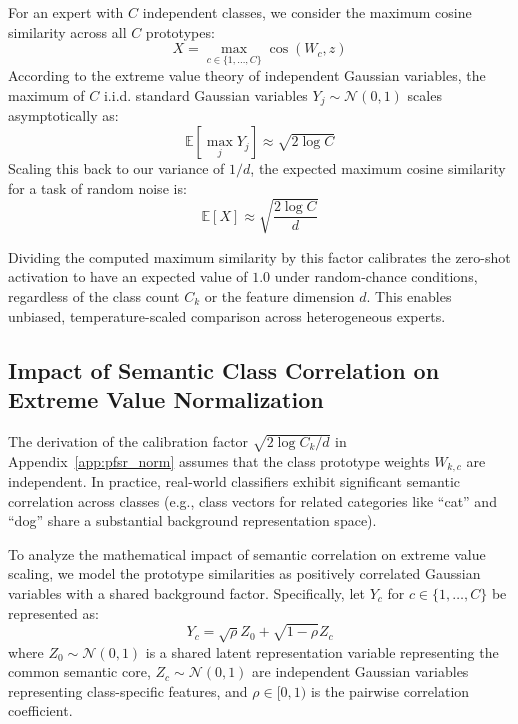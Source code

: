 \documentclass{article}
\theoremstyle{plain}
\theoremstyle{definition}
\theoremstyle{remark}
\begin{document}
For an expert with $C$ independent classes, we consider the maximum cosine similarity across all $C$ prototypes:
\begin{equation}
X = \max_{c \in \{1, \dots, C\}} \cos(W_c, z)
\end{equation}
According to the extreme value theory of independent Gaussian variables, the maximum of $C$ i.i.d. standard Gaussian variables $Y_j \sim \mathcal{N}(0, 1)$ scales asymptotically as:
\begin{equation}
\mathbb{E}[\max_{j} Y_j] \approx \sqrt{2 \log C}
\end{equation}
Scaling this back to our variance of $1/d$, the expected maximum cosine similarity for a task of random noise is:
\begin{equation}
\mathbb{E}[X] \approx \sqrt{\frac{2 \log C}{d}}
\end{equation}

Dividing the computed maximum similarity by this factor calibrates the zero-shot activation to have an expected value of $1.0$ under random-chance conditions, regardless of the class count $C_k$ or the feature dimension $d$. This enables unbiased, temperature-scaled comparison across heterogeneous experts.

\subsection{Impact of Semantic Class Correlation on Extreme Value Normalization}
\label{app:class_correlation}

The derivation of the calibration factor $\sqrt{2\log C_k / d}$ in Appendix~\ref{app:pfsr_norm} assumes that the class prototype weights $W_{k, c}$ are independent. In practice, real-world classifiers exhibit significant semantic correlation across classes (e.g., class vectors for related categories like ``cat'' and ``dog'' share a substantial background representation space). 

To analyze the mathematical impact of semantic correlation on extreme value scaling, we model the prototype similarities as positively correlated Gaussian variables with a shared background factor. Specifically, let $Y_c$ for $c \in \{1, \dots, C\}$ be represented as:
\begin{equation}
Y_c = \sqrt{\rho} Z_0 + \sqrt{1 - \rho} Z_c
\end{equation}
where $Z_0 \sim \mathcal{N}(0, 1)$ is a shared latent representation variable representing the common semantic core, $Z_c \sim \mathcal{N}(0, 1)$ are independent Gaussian variables representing class-specific features, and $\rho \in [0, 1)$ is the pairwise correlation coefficient.
\end{document}
